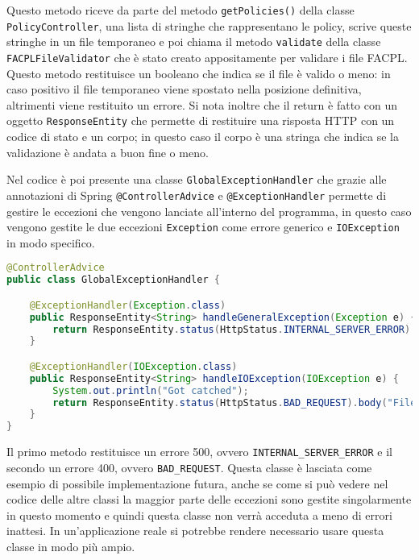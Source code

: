 Questo metodo riceve da parte del metodo \texttt{getPolicies()} della classe \texttt{PolicyController}, una lista di stringhe che rappresentano le policy, scrive queste stringhe in un file temporaneo e poi chiama il metodo \texttt{validate} della classe \texttt{FACPLFileValidator} che è stato creato appositamente per validare i file FACPL. Questo metodo restituisce un booleano che indica se il file è valido o meno: in caso positivo il file temporaneo viene spostato nella posizione definitiva, altrimenti viene restituito un errore. Si nota inoltre che il return è fatto con un oggetto \texttt{ResponseEntity} che permette di restituire una risposta HTTP con un codice di stato e un corpo; in questo caso il corpo è una stringa che indica se la validazione è andata a buon fine o meno.\par
Nel codice è poi presente una classe \texttt{GlobalExceptionHandler} che grazie alle annotazioni di Spring \texttt{@ControllerAdvice} e \texttt{@ExceptionHandler} permette di gestire le eccezioni che vengono lanciate all'interno del programma, in questo caso vengono gestite le due eccezioni \texttt{Exception} come errore generico e \texttt{IOException} in modo specifico.
\begin{lstlisting}[language=Java, caption=GlobalExceptionHandler, label=code:GlobalExceptionHandler, basicstyle=\fontsize{9.5}{11}\ttfamily]
@ControllerAdvice
public class GlobalExceptionHandler {

    @ExceptionHandler(Exception.class)
    public ResponseEntity<String> handleGeneralException(Exception e) {
        return ResponseEntity.status(HttpStatus.INTERNAL_SERVER_ERROR).body("An unexpected error occurred: " + e.getMessage());
    }

    @ExceptionHandler(IOException.class)
    public ResponseEntity<String> handleIOException(IOException e) {
    	System.out.println("Got catched");
        return ResponseEntity.status(HttpStatus.BAD_REQUEST).body("File processing error: " + e.getMessage());
    }
}
\end{lstlisting}
Il primo metodo restituisce un errore 500, ovvero \texttt{INTERNAL\_SERVER\_ERROR} e il secondo un errore 400, ovvero \texttt{BAD\_REQUEST}. Questa classe è lasciata come esempio di possibile implementazione futura, anche se come si può vedere nel codice delle altre classi la maggior parte delle eccezioni sono gestite singolarmente in questo momento e quindi questa classe non verrà acceduta a meno di errori inattesi. In un'applicazione reale si potrebbe rendere necessario usare questa classe in modo più ampio.

